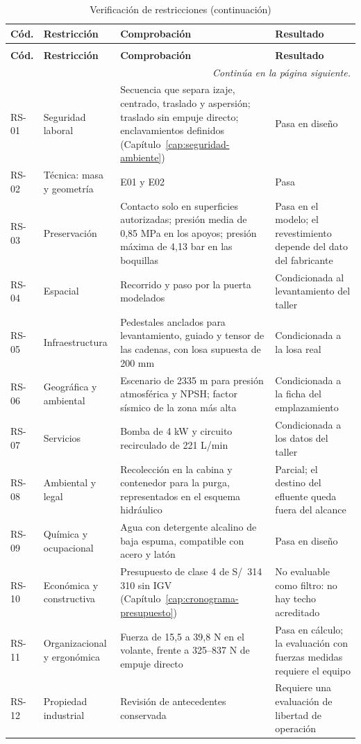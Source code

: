 \begingroup
\small\singlespacing
\setlength{\tabcolsep}{3.5pt}
\renewcommand{\arraystretch}{1.08}
\begin{longtable}{@{}p{1.1cm}>{\raggedright\arraybackslash}p{2.6cm}>{\raggedright\arraybackslash}p{\dimexpr\textwidth-1.1cm-2.6cm-4.0cm-8\tabcolsep\relax}>{\raggedright\arraybackslash}p{4.0cm}@{}}
\caption{Verificación de restricciones}\label{tab:cumplimiento-restricciones}\\
\toprule
\textbf{Cód.} & \textbf{Restricción} & \textbf{Comprobación} & \textbf{Resultado}\\
\midrule\endfirsthead
\caption[]{Verificación de restricciones (continuación)}\\
\toprule
\textbf{Cód.} & \textbf{Restricción} & \textbf{Comprobación} & \textbf{Resultado}\\
\midrule\endhead
\midrule\multicolumn{4}{r}{\textit{Continúa en la página siguiente.}}\\\endfoot
\bottomrule\endlastfoot
RS-01 & Seguridad laboral & Secuencia que separa izaje, centrado, traslado y aspersión; traslado sin empuje directo; enclavamientos definidos (Capítulo~\ref{cap:seguridad-ambiente}) & Pasa en diseño\\
RS-02 & Técnica: masa y geometría & E01 y E02 & Pasa\\
RS-03 & Preservación & Contacto solo en superficies autorizadas; presión media de 0,85 MPa en los apoyos; presión máxima de 4,13 bar en las boquillas & Pasa en el modelo; el revestimiento depende del dato del fabricante\\
RS-04 & Espacial & Recorrido y paso por la puerta modelados & Condicionada al levantamiento del taller\\
RS-05 & Infraestructura & Pedestales anclados para levantamiento, guiado y tensor de las cadenas, con losa supuesta de 200 mm & Condicionada a la losa real\\
RS-06 & Geográfica y ambiental & Escenario de 2335 m para presión atmosférica y NPSH; factor sísmico de la zona más alta & Condicionada a la ficha del emplazamiento\\
RS-07 & Servicios & Bomba de 4 kW y circuito recirculado de 221 L/min & Condicionada a los datos del taller\\
RS-08 & Ambiental y legal & Recolección en la cabina y contenedor para la purga, representados en el esquema hidráulico & Parcial; el destino del efluente queda fuera del alcance\\
RS-09 & Química y ocupacional & Agua con detergente alcalino de baja espuma, compatible con acero y latón \cite{zep36342} & Pasa en diseño\\
RS-10 & Económica y constructiva & Presupuesto de clase 4 de S/~314\,310 sin IGV (Capítulo~\ref{cap:cronograma-presupuesto}) & No evaluable como filtro: no hay techo acreditado\\
RS-11 & Organizacional y ergonómica & Fuerza de 15,5 a 39,8 N en el volante, frente a 325--837 N de empuje directo & Pasa en cálculo; la evaluación con fuerzas medidas requiere el equipo \cite{iso11228}\\
RS-12 & Propiedad industrial & Revisión de antecedentes conservada & Requiere una evaluación de libertad de operación\\
\end{longtable}
